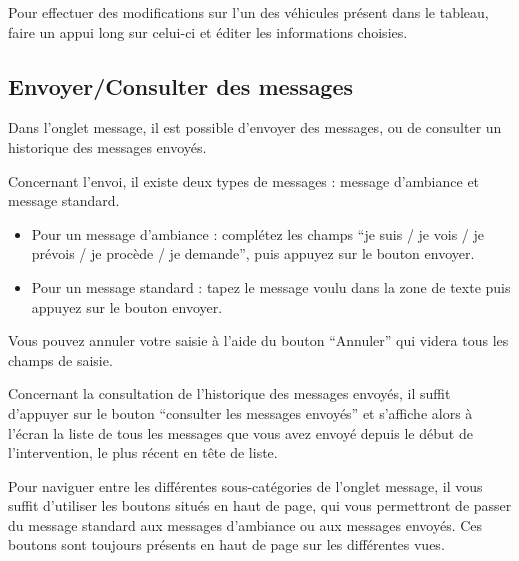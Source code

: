 \documentclass{article}
\begin{document}
Pour effectuer des modifications sur l’un des véhicules présent dans le tableau, faire un appui long sur celui-ci et éditer les informations choisies.

\subsection{Envoyer/Consulter des messages}

Dans l’onglet message, il est possible d’envoyer des messages, ou de consulter un historique des messages envoyés.

Concernant l’envoi, il existe deux types de messages : message d’ambiance et message standard.

\begin{itemize}
\item Pour un message d’ambiance : complétez les champs “je suis / je vois / je prévois / je procède / je demande”, puis appuyez sur le bouton envoyer.
\item Pour un message standard : tapez le message voulu dans la zone de texte puis appuyez sur le bouton envoyer.
\end{itemize}

Vous pouvez annuler votre saisie à l’aide du bouton “Annuler” qui videra tous les champs de saisie.

Concernant la consultation de l’historique des messages envoyés, il suffit d’appuyer sur le bouton “consulter les messages envoyés” et s’affiche alors à l’écran la liste de tous les messages que vous avez envoyé depuis le début de l’intervention, le plus récent en tête de liste.

Pour naviguer entre les différentes sous-catégories de l’onglet message, il vous suffit d’utiliser les boutons situés en haut de page, qui vous permettront de passer du message standard aux messages d’ambiance ou aux messages envoyés.  Ces boutons sont toujours présents en haut de page sur les différentes vues. 
\end{document}
